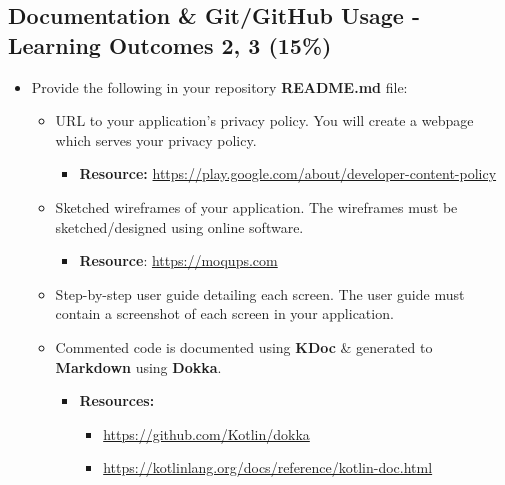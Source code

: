 \documentclass{article}
\begin{document}
\subsection*{Documentation \& Git/GitHub Usage - Learning Outcomes 2, 3 (15\%)}
\begin{itemize}
	\item Provide the following in your repository \textbf{README.md} file:
	      \begin{itemize}
		      \item URL to your application's privacy policy. You will create a webpage which serves your privacy policy.
		      \begin{itemize}
						\item \textbf{Resource:} \footnotesize\href{https://play.google.com/about/developer-content-policy}{https://play.google.com/about/developer-content-policy}
					\end{itemize} 
		      \item Sketched wireframes of your application. The wireframes must be sketched/designed using online software. 
		            \begin{itemize}
			            \item \textbf{Resource}: \footnotesize\href{https://moqups.com}{https://moqups.com}
		            \end{itemize}
		      \item Step-by-step user guide detailing each screen. The user guide must contain a screenshot of each screen in your application.
		      \item Commented code is documented using \textbf{KDoc} \& generated to \textbf{Markdown} using \textbf{Dokka}.
		      \begin{itemize}
						\item \textbf{Resources:}
		            \begin{itemize}
									\item \footnotesize\href{https://github.com/Kotlin/dokka}{https://github.com/Kotlin/dokka}
			            \item \footnotesize\href{https://kotlinlang.org/docs/reference/kotlin-doc.html}{https://kotlinlang.org/docs/reference/kotlin-doc.html}
		            \end{itemize}
					\end{itemize}
	      \end{itemize}
			\end{itemize}
\end{document}
